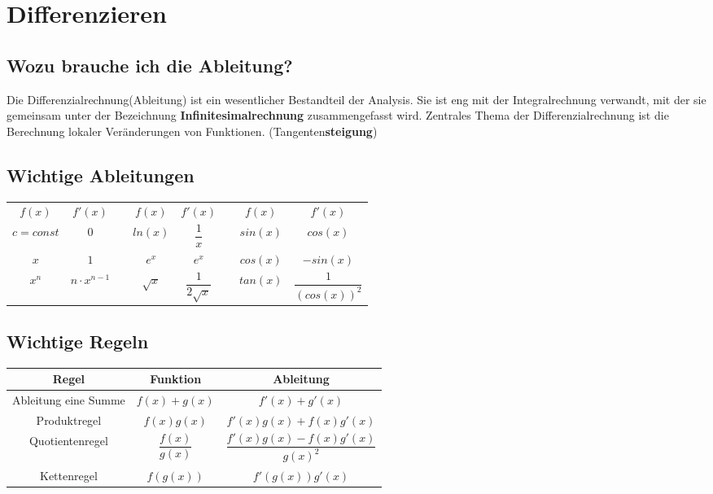 \section{Differenzieren}

\subsection{Wozu brauche ich die Ableitung?}
Die Differenzialrechnung(Ableitung) ist ein wesentlicher Bestandteil der Analysis. Sie ist eng mit der Integralrechnung verwandt, mit der sie gemeinsam unter der Bezeichnung \textbf{\grqq Infinitesimalrechnung\grqq}  zusammengefasst wird. Zentrales Thema der Differenzialrechnung ist die Berechnung lokaler Veränderungen von Funktionen. (Tangenten\textbf{steigung})

\subsection{Wichtige Ableitungen}
\renewcommand{\arraystretch}{2.0}
\begin{tabular}{|c|c|c|c|c|c|c|c|}
	\cline{1-2}\cline{4-5}\cline{7-8}
	\boldmath${f(x)}$ & \boldmath${f'(x)}$ &\qquad\qquad\qquad& \boldmath${f(x)}$ & \boldmath${f'(x)}$ &\qquad\qquad\qquad& \boldmath${f(x)}$ & \boldmath${f'(x)}$\\
	\cline{1-2}\cline{4-5}\cline{7-8}
	$c=const$ & $0$ && $ln(x)$ & $\dfrac{1}{x}$ && $sin(x)$ & $cos(x)$\\
	\cline{1-2}\cline{4-5}\cline{7-8}
	$x$ & $1$ && $e^x$ & $e^x$ && $cos(x)$ & $-sin(x)$\\
	\cline{1-2}\cline{4-5}\cline{7-8}
	$x^n$ & $n\cdot x^{n-1}$ && $\sqrt{x}$ & $\dfrac{1}{2\sqrt{x}}$ && $tan(x)$ & $\dfrac{1}{(cos(x))^2}$\\
	\cline{1-2}\cline{4-5}\cline{7-8}
\end{tabular}

\subsection{Wichtige Regeln}
\begin{tabular}{|c|c|c|}
	\hline
	\textbf{Regel} & \textbf{Funktion} & \textbf{Ableitung}\\
	\hline
	Ableitung eine Summe & $f(x)+g(x)$ & $f'(x)+g'(x)$\\
	\hline
	Produktregel & $f(x)g(x)$ & $f'(x)g(x)+f(x)g'(x)$\\
	\hline
	Quotientenregel & $\dfrac{f(x)}{g(x)}$ & $\dfrac{f'(x)g(x)-f(x)g'(x)}{g(x)^2}$\\
	\hline
	Kettenregel & $f(g(x))$ & $f'(g(x))g'(x)$\\
	\hline
\end{tabular}

